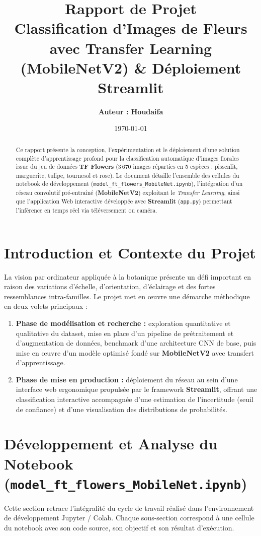 \documentclass[12pt,a4paper]{article}
\title{
    \vspace{-1.5cm}
    \textbf{\Huge Rapport de Projet} \\
    \vspace{0.4cm}
    \textbf{\Large Classification d'Images de Fleurs avec Transfer Learning (MobileNetV2) \& Déploiement Streamlit}
}
\author{\textbf{Auteur : Houdaifa}}
\date{\today}
\begin{document}
\maketitle

\begin{abstract}
Ce rapport présente la conception, l'expérimentation et le déploiement d'une solution complète d'apprentissage profond pour la classification automatique d'images florales issue du jeu de données \textbf{TF Flowers} (3\,670 images réparties en 5 espèces : pissenlit, marguerite, tulipe, tournesol et rose). Le document détaille l'ensemble des cellules du notebook de développement (\texttt{model\_ft\_flowers\_MobileNet.ipynb}), l'intégration d'un réseau convolutif pré-entraîné (\textbf{MobileNetV2}) exploitant le \textit{Transfer Learning}, ainsi que l'application Web interactive développée avec \textbf{Streamlit} (\texttt{app.py}) permettant l'inférence en temps réel via téléversement ou caméra.
\end{abstract}

\vspace{0.5cm}
\tableofcontents
\newpage

\section{Introduction et Contexte du Projet}
La vision par ordinateur appliquée à la botanique présente un défi important en raison des variations d'échelle, d'orientation, d'éclairage et des fortes ressemblances intra-familles. Le projet met en œuvre une démarche méthodique en deux volets principaux :
\begin{enumerate}
    \item \textbf{Phase de modélisation et recherche :} exploration quantitative et qualitative du dataset, mise en place d'un pipeline de prétraitement et d'augmentation de données, benchmark d'une architecture CNN de base, puis mise en œuvre d'un modèle optimisé fondé sur \textbf{MobileNetV2} avec transfert d'apprentissage.
    \item \textbf{Phase de mise en production :} déploiement du réseau au sein d'une interface web ergonomique propulsée par le framework \textbf{Streamlit}, offrant une classification interactive accompagnée d'une estimation de l'incertitude (seuil de confiance) et d'une visualisation des distributions de probabilités.
\end{enumerate}

\newpage
\section{Développement et Analyse du Notebook (\texttt{model\_ft\_flowers\_MobileNet.ipynb})}
Cette section retrace l'intégralité du cycle de travail réalisé dans l'environnement de développement Jupyter / Colab. Chaque sous-section correspond à une cellule du notebook avec son code source, son objectif et son résultat d'exécution.
\end{document}
